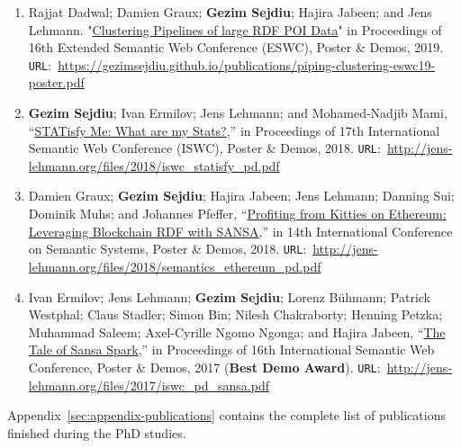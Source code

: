 \begin{itemize}
\begin{enumerate}
    \item Rajjat Dadwal; Damien Graux; \textbf{Gezim Sejdiu}; Hajira Jabeen; and Jens Lehmann. "\href{https://gezimsejdiu.github.io/publications/piping-clustering-eswc19-poster.pdf}{Clustering Pipelines of large RDF POI Data}" in Proceedings of 16th Extended Semantic Web Conference (ESWC), Poster \& Demos, 2019. \texttt{URL}:~\url{https://gezimsejdiu.github.io/publications/piping-clustering-eswc19-poster.pdf}
    
    \item \textbf{Gezim Sejdiu}; Ivan Ermilov; Jens Lehmann; and Mohamed-Nadjib Mami, “\href{http://jens-lehmann.org/files/2018/iswc_statisfy_pd.pdf}{STATisfy Me: What are my Stats?},” in Proceedings of 17th International Semantic Web Conference (ISWC), Poster \& Demos, 2018. \texttt{URL}:~\url{http://jens-lehmann.org/files/2018/iswc_statisfy_pd.pdf}
    
    \item Damien Graux; \textbf{Gezim Sejdiu}; Hajira Jabeen; Jens Lehmann; Danning Sui; Dominik Muhs; and Johannes Pfeffer, “\href{http://jens-lehmann.org/files/2018/semantics_ethereum_pd.pdf}{Profiting from Kitties on Ethereum: Leveraging Blockchain RDF with SANSA},” in 14th International Conference on Semantic Systems, Poster \& Demos, 2018. \texttt{URL}:~\url{http://jens-lehmann.org/files/2018/semantics_ethereum_pd.pdf}
    
    \item Ivan Ermilov; Jens Lehmann; \textbf{Gezim Sejdiu}; Lorenz Bühmann; Patrick Westphal; Claus Stadler; Simon Bin; Nilesh Chakraborty; Henning Petzka; Muhammad Saleem; Axel-Cyrille Ngomo Ngonga; and Hajira Jabeen, “\href{http://jens-lehmann.org/files/2017/iswc_pd_sansa.pdf}{The Tale of Sansa Spark},” in Proceedings of 16th International Semantic Web Conference, Poster \& Demos, 2017 ({\color{darkred}\textbf{Best Demo Award}}). \texttt{URL}:~\url{http://jens-lehmann.org/files/2017/iswc_pd_sansa.pdf}
        
    \end{enumerate}
\end{itemize}

Appendix~\ref{sec:appendix-publications} contains the complete list of publications finished during the PhD studies.

